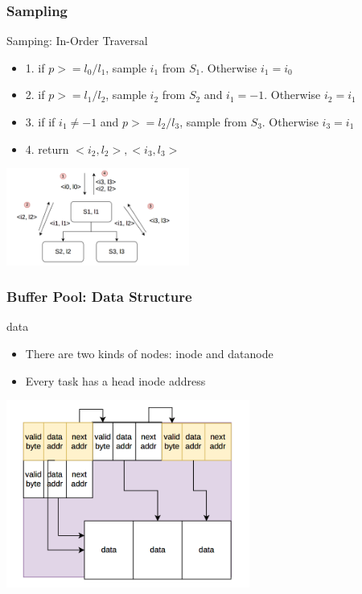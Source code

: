 \documentclass[notheorems, aspectratio=54]{beamer}
\begin{document}
\begin{frame}
    \frametitle{Sampling}
    \begin{block} {Samping: In-Order Traversal}
        \begin{itemize}
            \item 1. if $p >= l_0/l_1$, sample $i_1$ from $S_1$. Otherwise $i_1 = i_0$
            \item 2. if $p >= l_1/l_2$, sample $i_2$ from $S_2$ and $i_1 = -1$. Otherwise $i_2 = i_1$
            \item 3. if if $i_1 \neq -1$ and $p >= l_2/l_3$, sample from $S_3$. Otherwise $i_3 = i_1$
            \item 4. return $<i_2, l_2>, <i_3, l_3>$
        \end{itemize}
    \end{block}
    \centering
    \includegraphics[width=6cm]{global_img_dir/Sampling.png}
\end{frame}

\begin{frame}
    \frametitle{Buffer Pool: Data Structure}
    \begin{block} {data}
        \begin{itemize}
            \item There are two kinds of nodes: inode and datanode
            \item Every task has a head inode address
        \end{itemize}
    \end{block}
    \centering
    \includegraphics[width=8cm]{global_img_dir/linklist.png}
\end{frame}
\end{document}
